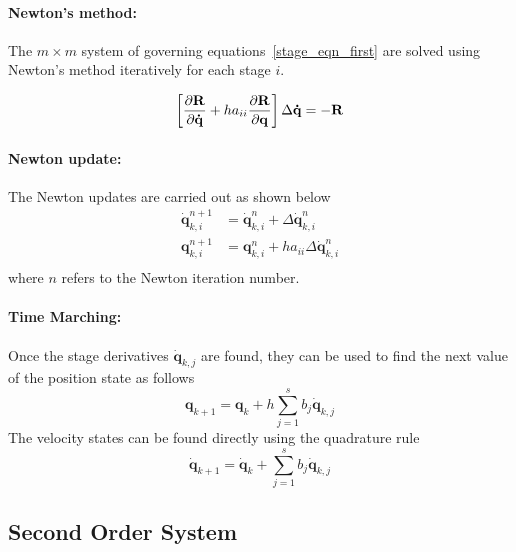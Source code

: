 \documentclass[pdftex,11pt,letter]{article}
\begin{document}
\begin{multicols}{2}
\paragraph{Newton's method:}

The $m \times m$ system of governing equations~\eqref{stage_eqn_first}
are solved using Newton's method iteratively for each stage $i$.

\begin{equation}
\left[\dfrac{\partial \mathbf{R}}{\partial \mathbf{\dot{q}}} + h a_{ii}
  \dfrac{\partial \mathbf{R}}{\partial \mathbf{q}}\right] \Delta\mathbf{\dot{q}} = -\mathbf{R}
\end{equation}

\paragraph{Newton update:}
The Newton updates are carried out as shown below
\begin{equation}\label{newton_update}
  \begin{split}
    \mathbf{\dot{q}}_{k,i}^{n+1} & = \mathbf{\dot{q}}_{k,i}^{n} +
    \Delta\mathbf{\dot{q}}_{k,i}^{n} \\
    \mathbf{q}_{k,i}^{n+1} & = \mathbf{q}_{k,i}^n + h a_{ii}
    \Delta\mathbf{\dot{q}}_{k,i}^n \\
  \end{split}
\end{equation}
where $n$ refers to the Newton iteration number.

\paragraph{Time Marching:}

Once the stage derivatives $\mathbf{\dot{q}}_{k,j}$ are found, they can
be used to find the next value of the position state as follows
\begin{equation}
  \mathbf{q}_{k+1} = \mathbf{q}_{k} +h \sum_{j=1}^s b_j \mathbf{\dot{q}}_{k,j}
\end{equation}
The velocity states can be found directly using the quadrature rule
\begin{equation}
  \mathbf{\dot{q}}_{k+1} = \mathbf{\dot{q}}_{k} + \sum_{j=1}^s b_j \mathbf{\dot{q}}_{k,j}
\end{equation}

\subsection{Second Order System}


\end{multicols}
\end{document}
